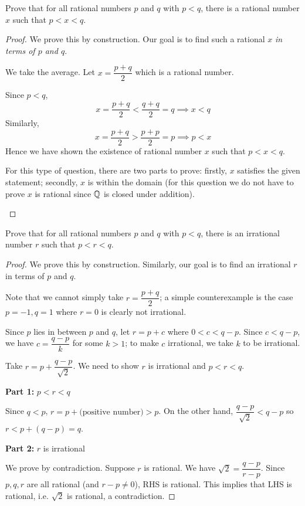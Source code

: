 \begin{exercise}
Prove that for all rational numbers $p$ and $q$ with $p<q$, there is a rational number $x$ such that $p<x<q$.
\end{exercise}
\begin{proof}
We prove this by construction. Our goal is to find such a rational $x$ \emph{in terms of $p$ and $q$}.

We take the average. Let $x=\dfrac{p+q}{2}$ which is a rational number.

Since $p<q$, 
\[ x=\frac{p+q}{2}<\frac{q+q}{2}=q \implies x<q \]
Similarly,
\[ x=\frac{p+q}{2}>\frac{p+p}{2}=p \implies p<x \]
Hence we have shown the existence of rational number $x$ such that $p<x<q$.

\begin{remark}
For this type of question, there are two parts to prove: firstly, $x$ satisfies the given statement; secondly, $x$ is within the domain (for this question we do not have to prove $x$ is rational since $\mathbb Q$ is closed under addition).
\end{remark}
\end{proof}

\begin{exercise}
Prove that for all rational numbers $p$ and $q$ with $p<q$, there is an irrational number $r$ such that $p<r<q$.
\end{exercise}
\begin{proof}
We prove this by construction. Similarly, our goal is to find an irrational $r$ in terms of $p$ and $q$.

Note that we cannot simply take $r=\dfrac{p+q}{2}$; a simple counterexample is the case $p=-1,q=1$ where $r=0$ is clearly not irrational.

Since $p$ lies in between $p$ and $q$, let $r=p+c$ where $0<c<q-p$. Since $c<q-p$, we have $c=\dfrac{q-p}{k}$ for some $k>1$; to make $c$ irrational, we take $k$ to be irrational.

Take $r=p+\dfrac{q-p}{\sqrt{2}}$. We need to show $r$ is irrational and $p<r<q$.

\textbf{Part 1:} $p<r<q$

Since $q<p$, $r=p+\text{(positive number)}>p$. On the other hand, $\dfrac{q-p}{\sqrt{2}}<q-p$ so $r<p+(q-p)=q$.

\textbf{Part 2:} $r$ is irrational

We prove by contradiction. Suppose $r$ is rational. We have $\sqrt{2}=\dfrac{q-p}{r-p}$. Since $p,q,r$ are all rational (and $r-p\neq0$), RHS is rational. This implies that LHS is rational, i.e. $\sqrt{2}$ is rational, a contradiction.
\end{proof}

